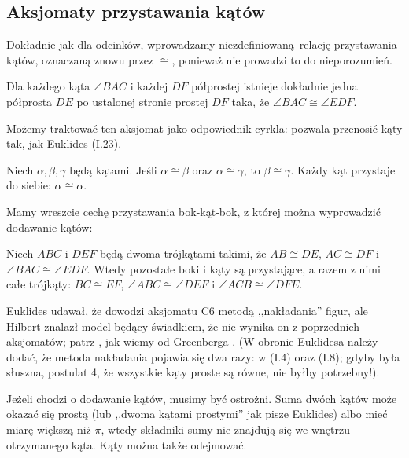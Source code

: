 \subsection{Aksjomaty przystawania kątów}
Dokładnie jak dla odcinków, wprowadzamy niezdefiniowaną relację przystawania kątów, oznaczaną znowu przez $\cong$, ponieważ nie prowadzi to do nieporozumień.

\begin{axiom}[przystawania, C4]
    Dla każdego kąta $\angle BAC$ i każdej $DF$ półprostej istnieje dokładnie jedna półprosta $DE$ po ustalonej stronie prostej $DF$ taka, że $\angle BAC \cong \angle EDF$.
\end{axiom}

Możemy traktować ten aksjomat jako odpowiednik cyrkla: pozwala przenosić kąty tak, jak Euklides (I.23).

\begin{axiom}[przystawania, C5]
    Niech $\alpha, \beta, \gamma$ będą kątami.
    Jeśli $\alpha \cong \beta$ oraz $\alpha \cong \gamma$, to $\beta \cong \gamma$.
    Każdy kąt przystaje do siebie: $\alpha \cong \alpha$.
\end{axiom}

Mamy wreszcie cechę przystawania bok-kąt-bok, z której można wyprowadzić dodawanie kątów:
%

\begin{axiom}[przystawania, C6]
    Niech $ABC$ i $DEF$ będą dwoma trójkątami takimi, że $AB \cong DE$, $AC \cong DF$ i $\angle BAC \cong \angle EDF$.
    Wtedy pozostałe boki i kąty są przystające, a razem z nimi całe trójkąty: $BC \cong EF$, $\angle ABC \cong \angle DEF$ i $\angle ACB \cong \angle DFE$.
\end{axiom}

Euklides udawał, że dowodzi aksjomatu C6 metodą ,,nakładania'' figur, ale Hilbert znalazł model będący świadkiem, że nie wynika on z poprzednich aksjomatów; patrz \cite[paragraf 11]{hilbert_1988}, jak wiemy od Greenberga \cite[s. 200]{greenberg_2010}.
(W obronie Euklidesa należy dodać, że metoda nakładania pojawia się dwa razy: w (I.4) oraz (I.8); gdyby była słuszna, postulat 4, że wszystkie kąty proste są równe, nie byłby potrzebny!).
%

Jeżeli chodzi o dodawanie kątów, musimy być ostrożni.
Suma dwóch kątów może okazać się prostą (lub ,,dwoma kątami prostymi'' jak pisze Euklides) albo mieć miarę większą niż $\pi$, wtedy składniki sumy nie znajdują się we wnętrzu otrzymanego kąta.
Kąty można także odejmować.

